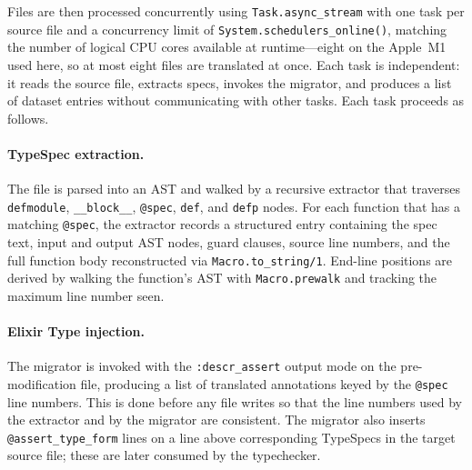 Files are then processed concurrently using \texttt{Task.async\_stream} with one task per source file and a concurrency limit of \texttt{System.schedulers\_online()}, matching the number of logical CPU cores available at runtime---eight on the Apple~M1 used here, so at most eight files are translated at once.
Each task is independent: it reads the source file, extracts specs, invokes the migrator, and produces a list of dataset entries without communicating with other tasks.
Each task proceeds as follows.

\paragraph{TypeSpec extraction.}
The file is parsed into an AST and walked by a recursive extractor that traverses \texttt{defmodule}, \texttt{\_\_block\_\_}, \texttt{@spec}, \texttt{def}, and \texttt{defp} nodes.
For each function that has a matching \texttt{@spec}, the extractor records a structured entry containing the spec text, input and output AST nodes, guard clauses, source line numbers, and the full function body reconstructed via \texttt{Macro.to\_string/1}.
End-line positions are derived by walking the function's AST with \texttt{Macro.prewalk} and tracking the maximum line number seen.

\paragraph{Elixir Type injection.}
The migrator is invoked with the \texttt{:descr\_assert} output mode on the pre-modification file, producing a list of translated annotations keyed by the \texttt{@spec} line numbers.
This is done before any file writes so that the line numbers used by the extractor and by the migrator are consistent.
The migrator also inserts \texttt{@assert\_type\_form} lines on a line above corresponding TypeSpecs in the target source file; these are later consumed by the typechecker.

